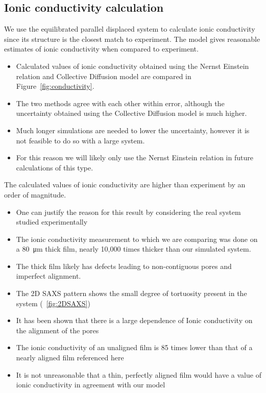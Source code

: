 \documentclass{article}
\begin{document}
  \subsection*{Ionic conductivity calculation}

  We use the equilibrated parallel displaced system to calculate ionic 
  conductivity since its structure is the closest match to experiment.
  The model gives reasonable estimates of ionic conductivity when compared to 
  experiment.
  \begin{itemize}
  	\item Calculated values of ionic conductivity obtained using the Nernst 
	Einstein relation and Collective Diffusion model are compared in 
	Figure~\ref{fig:conductivity}.
	\item The two methods agree with each other within error, although the 
	uncertainty obtained using the Collective Diffusion model is much higher.
	\item Much longer simulations are needed to lower the uncertainty, however it
	is not feasible to do so with a large system.  
	\item For this reason we will likely only use the Nernst Einstein relation
	in future calculations of this type. 
  \end{itemize}

  The calculated values of ionic conductivity are higher than experiment by an
  order of magnitude. 
  \begin{itemize}
	\item One can justify the reason for this result by considering the 
	real system studied experimentally
	\item The ionic conductivity measurement to which we are comparing was done
	on a \SI{80}{\micro\metre} thick film, nearly 10,000 times thicker than 
        our simulated system. 
	\item The thick film likely has defects leading to non-contiguous pores and
	imperfect alignment.
	\item The 2D SAXS pattern shows the small degree of tortuosity present
	in the system (~\ref{fig:2DSAXS})  %
	\item It has been shown that there is a large dependence of Ionic conductivity
	on the alignment of the pores
	\item The ionic conductivity of an unaligned film is 85 times lower than that
	of a nearly aligned film referenced here  %
	\item It is not unreasonable that a thin, perfectly aligned film would have 
	a value of ionic conductivity in agreement with our model
  \end{itemize}
\end{document}
